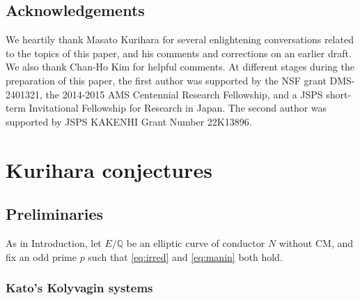 \documentclass[10pt,reqno]{amsart}
\numberwithin{equation}{section}
\theoremstyle{plain}
\theoremstyle{definition}
\newtheorem{rem}[thm]{Remark}
\theoremstyle{definition}
\theoremstyle{plain}
\theoremstyle{plain}
\theoremstyle{plain}
\theoremstyle{plain}
\theoremstyle{plain}
\theoremstyle{plain}
\newcommand{\Q}{\mathbb{Q}}
\begin{document}



\subsection{Acknowledgements}
We heartily thank Masato Kurihara for several enlightening conversations related to the topics of this paper, and his comments and corrections on an earlier draft. We also thank Chan-Ho Kim for helpful comments. At different stages during the preparation of this paper, the first author was supported by the NSF grant DMS-2401321, the 2014-2015 AMS Centennial Research Fellowship, and a JSPS short-term Invitational Fellowship for Research in Japan. The second author was supported by JSPS KAKENHI Grant Number 22K13896.



\section{Kurihara conjectures}


\subsection{Preliminaries}

As in Introduction, let $E/\Q$ be an elliptic curve of conductor $N$ without CM, and fix an odd prime $p$ such that \eqref{eq:irred} and \eqref{eq:manin} both hold.

\subsubsection{Kato's Kolyvagin systems}
\end{document}
